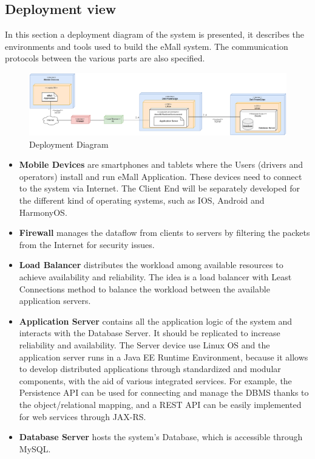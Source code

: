 \documentclass[../main.tex]{subfiles}
\begin{document}
\newpage
\subsection{Deployment view}
In this section a deployment diagram of the system is presented, it describes the environments and tools used to build the eMall system. The communication protocols between the various parts are also specified.

\begin{figure}[H]
    \includegraphics[width=1.05\textwidth]{images/DeploymentDiagram.png}
    \caption{Deployment Diagram}
    \label{fig:deploymentDiagram}
\end{figure}

\begin{itemize}
    \item \textbf{Mobile Devices} are smartphones and tablets where the Users (drivers and operators) install and run eMall Application. These devices need to connect to the system via Internet. The Client End will be separately developed for the different kind of operating systems, such as IOS, Android and HarmonyOS.
    \item \textbf{Firewall} manages the dataflow from clients to servers by filtering the packets from the Internet for security issues.
    \item \textbf{Load Balancer} distributes the workload among available resources to achieve availability and reliability. The idea is a load balancer with Least Connections method to balance the workload between the available application servers.
    \item \textbf{Application Server} contains all the application logic of the system and interacts with the Database Server. It should be replicated to increase reliability and availability. The Server device use Linux OS and the application server runs in a Java EE Runtime Environment, because it allows to develop distributed applications through standardized and modular components, with the aid of various integrated services. For example, the Persistence API can be used for connecting and manage the DBMS thanks to the object/relational mapping, and a REST API can be easily implemented for web services through JAX-RS.
    \item \textbf{Database Server} hosts the system’s Database, which is accessible through MySQL.
\end{itemize}
\end{document}
